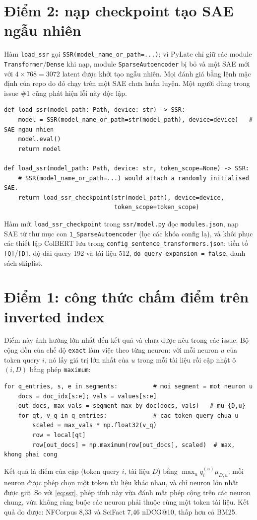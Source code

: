 \documentclass[a4paper,13pt]{extreport}
\makeatletter
\theoremstyle{plain}
\newcommand{\ndcg}{nDCG@10}
\makeatother
\begin{document}
\section{Điểm 2: nạp checkpoint tạo SAE ngẫu nhiên}
Hàm \texttt{load\_ssr} gọi \texttt{SSR(model\_name\_or\_path=...)}; vì PyLate chỉ giữ các module \texttt{Transformer}/\texttt{Dense} khi nạp, module \texttt{SparseAutoencoder} bị bỏ và một SAE mới với $4\times768=3072$ latent được khởi tạo ngẫu nhiên. Mọi đánh giá bằng lệnh mặc định của repo do đó chạy trên một SAE chưa huấn luyện. Một người dùng trong issue \#1 cũng phát hiện lỗi này độc lập.
\begin{lstlisting}[caption={\texttt{ssr/retrieval/eval\_mteb.py}: trước (trên) và sau khi sửa (dưới).}]
def load_ssr(model_path: Path, device: str) -> SSR:
    model = SSR(model_name_or_path=str(model_path), device=device)   # SAE ngau nhien
    model.eval()
    return model

def load_ssr(model_path: Path, device: str, token_scope=None) -> SSR:
    # SSR(model_name_or_path=...) would attach a randomly initialised SAE.
    return load_ssr_checkpoint(str(model_path), device=device,
                               token_scope=token_scope)
\end{lstlisting}
Hàm mới \texttt{load\_ssr\_checkpoint} trong \texttt{ssr/model.py} đọc \texttt{modules.json}, nạp SAE từ thư mục con \texttt{1\_SparseAutoencoder} (lọc các khóa config lạ), và khôi phục các thiết lập ColBERT lưu trong \texttt{config\_sentence\_transformers.json}: tiền tố \texttt{[Q]}/\texttt{[D]}, độ dài query 192 và tài liệu 512, \texttt{do\_query\_expansion = false}, danh sách skiplist.

\section{Điểm 1: công thức chấm điểm trên inverted index}
\label{sec:bug-exact}
Điểm này ảnh hưởng lớn nhất đến kết quả và chưa được nêu trong các issue. Bộ cộng dồn của chế độ \texttt{exact} làm việc theo từng neuron: với mỗi neuron $u$ của token query $i$, nó lấy giá trị lớn nhất của $u$ trong mỗi tài liệu rồi cập nhật ô $(i, D)$ bằng phép \texttt{maximum}:
\begin{lstlisting}[caption={\texttt{inverted\_index.py} gốc: bộ cộng dồn lấy max theo từng neuron.}]
for q_entries, s, e in segments:          # moi segment = mot neuron u
    docs = doc_idx[s:e]; vals = values[s:e]
    out_docs, max_vals = segment_max_by_doc(docs, vals)   # mu_{D,u}
    for qt, v_q in q_entries:             # cac token query chua u
        scaled = max_vals * np.float32(v_q)
        row = local[qt]
        row[out_docs] = np.maximum(row[out_docs], scaled)  # max, khong phai cong
\end{lstlisting}
Kết quả là điểm của cặp (token query $i$, tài liệu $D$) bằng $\max_u q_i^{(u)}\mu_{D,u}$: mỗi neuron được phép chọn một token tài liệu khác nhau, và chỉ neuron lớn nhất được giữ. So với \eqref{eq:ssr}, phép tính này vừa đánh mất phép cộng trên các neuron chung, vừa không ràng buộc các neuron phải thuộc cùng một token tài liệu. Kết quả đo được: NFCorpus 8,33 và SciFact 7,46 \ndcg, thấp hơn cả BM25.
\end{document}
